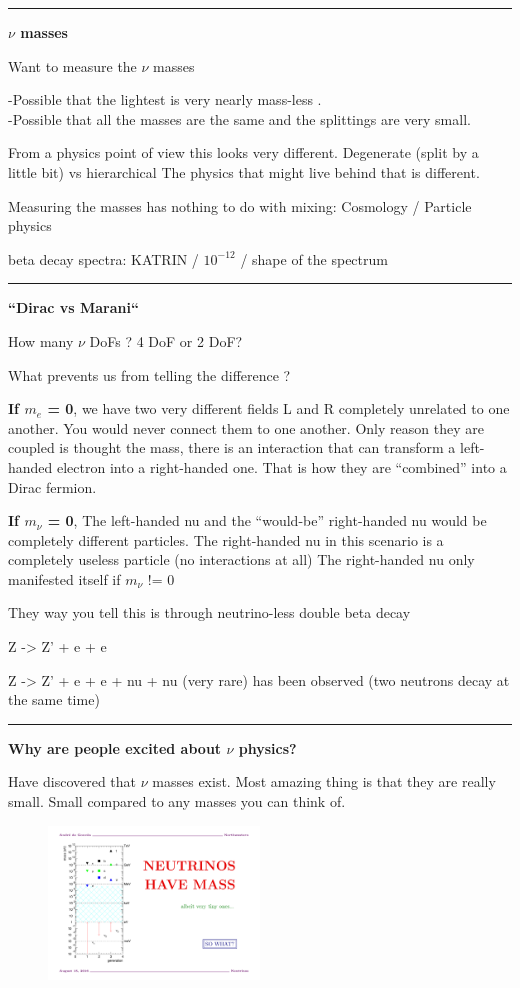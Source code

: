 {\noindent\rule{\textwidth}{1pt}

\textbf{$\nu$ masses}

Want to measure the $\nu$ masses

-Possible that the lightest is very nearly mass-less . \\
-Possible that all the masses are the same and the splittings are very small.

From a physics point of view this looks very different.
\bc
 Degenerate (split by a little bit)  vs  hierarchical 
\ec
The physics that might live behind that is different.

Measuring the masses has nothing to do with mixing: Cosmology / Particle physics 
 
beta decay spectra: KATRIN /  $10^{-12}$ / shape of the spectrum

\noindent\rule{\textwidth}{1pt}

\textbf{``Dirac vs Marani``} 

How many $\nu$ DoFs ?  4 DoF  or 2 DoF? 

What prevents us from telling the difference ?

\textbf{If $m_e$ = 0}, we have two very different fields L and R completely unrelated to one another.
You would never connect them to one another. 
Only reason they are coupled is thought the mass, there is an interaction that can transform a left-handed electron into a right-handed one.
That is how they are ``combined'' into a Dirac fermion.

\textbf{If $m_\nu$ = 0},
The left-handed nu and the ``would-be'' right-handed nu would be completely different particles. 
The right-handed nu in this scenario is a completely useless particle (no interactions at all)
The right-handed nu only manifested itself if $m_\nu$ != 0

They way you tell this is through neutrino-less double beta decay

 Z -> Z' + e + e 

 Z -> Z' + e + e  + nu + nu (very rare) has been observed (two neutrons decay at the same time) 


\noindent\rule{\textwidth}{1pt} 

\textbf{Why are people excited about $\nu$ physics? }

Have discovered that $\nu$ masses exist. 
Most amazing thing is that they are really small. 
Small compared to any masses you can think of. 

\begin{figure}[h!]
\centering
\includegraphics[width=0.5\textwidth]{./NuMass2.pdf}
\end{figure}


}
